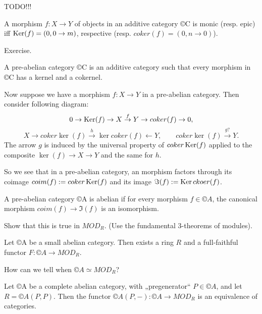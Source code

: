 \documentclass[12pt]{article}					%
\begin{document}

TODO!!!

\begin{tvrzeni}
	A morphism $f: X \rightarrow Y$ of objects in an additive category ©C is monic (resp. epic) iff $\operatorname{Ker} (f) = (0, 0 \rightarrow m)$, respective (resp. $coker(f) = (0, n \rightarrow 0)$).

	\begin{dukazin}
		Exercise.
	\end{dukazin}
\end{tvrzeni}

\begin{definice}
	A pre-abelian category ©C is an additive category such that every morphism in ©C has a kernel and a cokernel.
\end{definice}

\begin{poznamka}
	Now suppose we have a morphism $f: X \rightarrow Y$ in a pre-abelian category. Then consider following diagram:
	$$ 0 \rightarrow \operatorname{Ker}(f) \rightarrow X \overset{f}\rightarrow Y \rightarrow coker(f) \rightarrow 0, $$
	$$ X \rightarrow coker \ker (f) \overset{h}\rightarrow \ker coker(f) \leftarrow Y, \qquad coker \ker (f) \overset{g?}\rightarrow Y. $$
	The arrow $g$ is induced by the universal property of $coker \operatorname{Ker} (f)$ applied to the composite $\ker(f) \rightarrow X \rightarrow Y$ and the same for $h$.

	So we see that in a pre-abelian category, an morphism factors through its coimage $coim(f) := coker \operatorname{Ker} (f)$ and its image $\Im(f) := \operatorname{Ker} ckoer(f)$.
\end{poznamka}

\begin{definice}
	A pre-abelian category ©A is abelian if for every morphism $f \in ©A$, the canonical morphism $coim(f) \rightarrow \Im(f)$ is an isomorphism.
\end{definice}

\begin{priklad}
	Show that this is true in $MOD_R$. (Use the fundamental 3-theorems of modules).
\end{priklad}

\begin{veta}
	Let ©A be a small abelian category. Then exists a ring $R$ and a full-faithful functor $F: ©A \rightarrow MOD_R$.
\end{veta}

\begin{poznamkain}
	How can we tell when $©A \simeq MOD_R$?
\end{poznamkain}

\begin{veta}
	Let ©A be a complete abelian category, with „pregenerator“ $P \in ©A$, and let $R = ©A(P, P)$. Then the functor $©A(P, -): ©A \rightarrow MOD_R$ is an equivalence of categories.
\end{veta}
\end{document}
